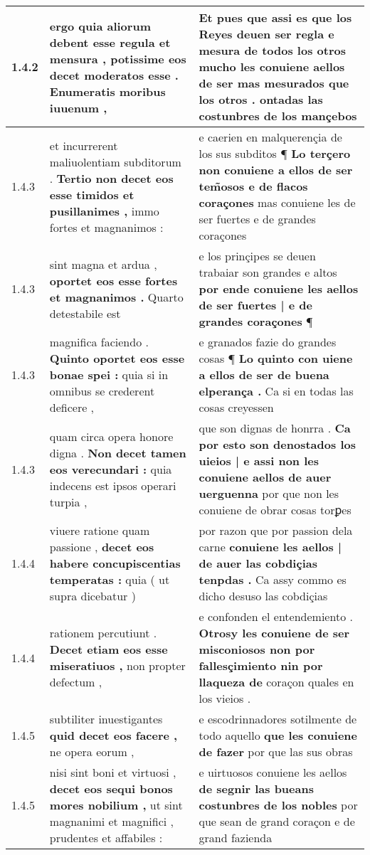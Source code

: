 \begin{tabular}{|p{1cm}|p{6.5cm}|p{6.5cm}|}
1.4.2 & ergo quia aliorum debent esse regula et mensura , \textbf{ potissime eos decet moderatos esse . } Enumeratis moribus iuuenum , & Et pues que assi es que los Reyes deuen ser regla \textbf{ e mesura de todos los otros mucho les conuiene aellos de ser mas mesurados que los otros . } ontadas las costunbres de los mançebos \\\hline
1.4.3 & et incurrerent maliuolentiam subditorum . \textbf{ Tertio non decet eos esse timidos et pusillanimes , } immo fortes et magnanimos : & e caerien en malquerençia de los sus subditos ¶ \textbf{ Lo terçero non conuiene a ellos de ser tem̃osos e de flacos coraçones } mas conuiene les de ser fuertes e de grandes coraçones \\\hline
1.4.3 & sint magna et ardua , \textbf{ oportet eos esse fortes et magnanimos . } Quarto detestabile est & e los prinçipes se deuen trabaiar son grandes e altos \textbf{ por ende conuiene les aellos de ser fuertes | e de grandes coraçones } ¶ \\\hline
1.4.3 & magnifica faciendo . \textbf{ Quinto oportet eos esse bonae spei : } quia si in omnibus se crederent deficere , & e granados fazie do grandes cosas ¶ \textbf{ Lo quinto con uiene a ellos de ser de buena elperança . } Ca si en todas las cosas creyessen \\\hline
1.4.3 & quam circa opera honore digna . \textbf{ Non decet tamen eos verecundari : } quia indecens est ipsos operari turpia , & que son dignas de honrra . \textbf{ Ca por esto son denostados los uieios | e assi non les conuiene aellos de auer uerguenna } por que non les conuiene de obrar cosas torꝑes \\\hline
1.4.4 & viuere ratione quam passione , \textbf{ decet eos habere concupiscentias temperatas : } quia ( ut supra dicebatur ) & por razon que por passion dela carne \textbf{ conuiene les aellos | de auer las cobdiçias tenpdas . } Ca assy commo es dicho desuso las cobdiçias \\\hline
1.4.4 & rationem percutiunt . \textbf{ Decet etiam eos esse miseratiuos , } non propter defectum , & e confonden el entendemiento . \textbf{ Otrosy les conuiene de ser misconiosos non por fallesçimiento nin por llaqueza de } coraçon quales en los vieios . \\\hline
1.4.5 & subtiliter inuestigantes \textbf{ quid decet eos facere , } ne opera eorum , & e escodrinnadores sotilmente de todo aquello \textbf{ que les conuiene de fazer } por que las sus obras \\\hline
1.4.5 & nisi sint boni et virtuosi , \textbf{ decet eos sequi bonos mores nobilium , } ut sint magnanimi et magnifici , prudentes et affabiles : & e uirtuosos conuiene les aellos \textbf{ de segnir las bueans costunbres de los nobles } por que sean de grand coraçon e de grand fazienda \\\hline

\end{tabular}
